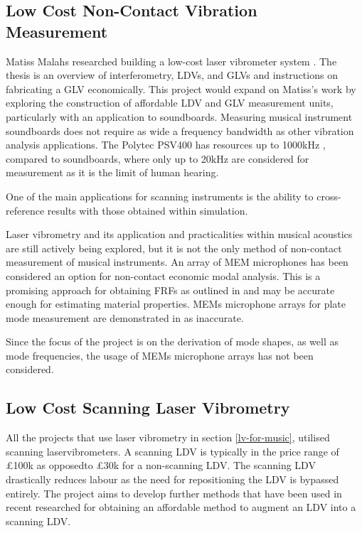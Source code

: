 \subsection{Low Cost Non-Contact Vibration Measurement}

Matiss Malahs researched building a low-cost laser vibrometer system \cite{malahs_design_2015}. The thesis is an overview of interferometry, LDVs, and GLVs and instructions on fabricating a GLV economically. This project would expand on Matiss's work by exploring the construction of affordable LDV and GLV measurement units, particularly with an application to soundboards. Measuring musical instrument soundboards does not require as wide a frequency bandwidth as other vibration analysis applications. The Polytec PSV400  has resources up to 1000kHz \cite{polytec_psv-400-3d_2009}, compared to soundboards, where only up to 20kHz are considered for measurement as it is the limit of human hearing.

One of the main applications for scanning instruments is the ability to
cross-reference results with those obtained within simulation. 

Laser vibrometry and its application and practicalities within musical acoustics are still actively being explored, but it is not the only method of non-contact measurement of musical instruments. An array of MEM microphones has been considered an option for non-contact economic modal analysis. This is a promising approach for obtaining FRFs as outlined in \cite{farshidi_noncontact_2010} and may be accurate enough for estimating material properties. MEMs microphone arrays for plate mode measurement are demonstrated in \cite{velsen_plate_2015} as inaccurate.

Since the focus of the project is on the derivation of mode shapes, as well as
mode frequencies, the usage of MEMs microphone arrays has not been considered.


\subsection{Low Cost Scanning Laser Vibrometry}

All the projects that use laser vibrometry in section \ref{lv-for-music}, utilised 
scanning laservibrometers. A scanning LDV is typically in the price range of £100k 
as opposedto £30k for a non-scanning LDV. The scanning LDV drastically reduces labour 
as the need for repositioning the LDV is bypassed entirely. The project aims to
develop further methods that have been used in recent researched for obtaining
an affordable method to augment an LDV into a scanning LDV.

